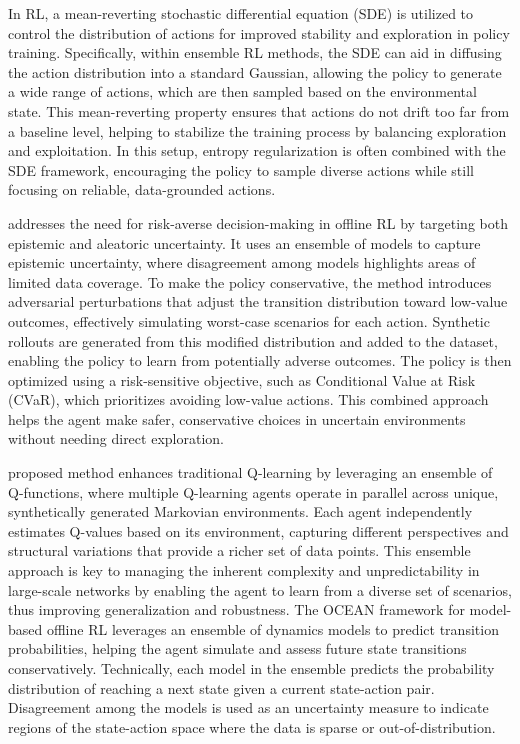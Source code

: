 In RL, a mean-reverting stochastic differential equation (SDE) is utilized to control the distribution of actions for improved stability and exploration in policy training\cite{zhang2024entropy}. Specifically, within ensemble RL methods, the SDE can aid in diffusing the action distribution into a standard Gaussian, allowing the policy to generate a wide range of actions, which are then sampled based on the environmental state. This mean-reverting property ensures that actions do not drift too far from a baseline level, helping to stabilize the training process by balancing exploration and exploitation. In this setup, entropy regularization is often combined with the SDE framework, encouraging the policy to sample diverse actions while still focusing on reliable, data-grounded actions.

 \cite{rigter2024one} addresses the need for risk-averse decision-making in offline RL by targeting both epistemic and aleatoric uncertainty. It uses an ensemble of models to capture epistemic uncertainty, where disagreement among models highlights areas of limited data coverage. To make the policy conservative, the method introduces adversarial perturbations that adjust the transition distribution toward low-value outcomes, effectively simulating worst-case scenarios for each action. Synthetic rollouts are generated from this modified distribution and added to the dataset, enabling the policy to learn from potentially adverse outcomes. The policy is then optimized using a risk-sensitive objective, such as Conditional Value at Risk (CVaR), which prioritizes avoiding low-value actions. This combined approach helps the agent make safer, conservative choices in uncertain environments without needing direct exploration. 

\cite{bozkus2024multi} proposed method enhances traditional Q-learning by leveraging an ensemble of Q-functions, where multiple Q-learning agents operate in parallel across unique, synthetically generated Markovian environments. Each agent independently estimates Q-values based on its environment, capturing different perspectives and structural variations that provide a richer set of data points. This ensemble approach is key to managing the inherent complexity and unpredictability in large-scale networks by enabling the agent to learn from a diverse set of scenarios, thus improving generalization and robustness. The OCEAN framework for model-based offline RL leverages an ensemble of dynamics models to predict transition probabilities, helping the agent simulate and assess future state transitions conservatively\cite{wu2024ocean}. Technically, each model in the ensemble predicts the probability distribution of reaching a next state given a current state-action pair. Disagreement among the models is used as an uncertainty measure to indicate regions of the state-action space where the data is sparse or out-of-distribution.